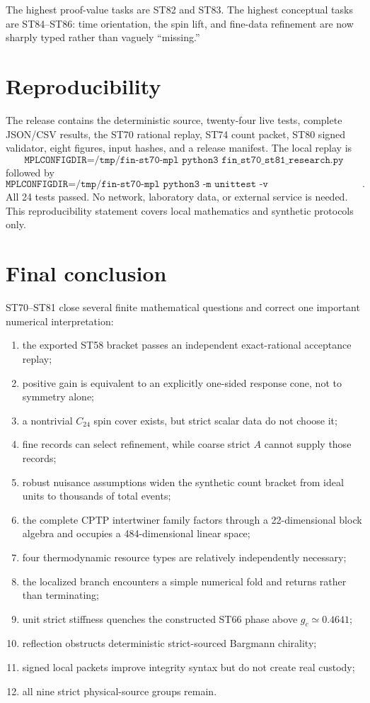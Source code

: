 \documentclass[11pt,a4paper]{article}
\begin{document}
The highest proof-value tasks are ST82 and ST83. The highest conceptual tasks are ST84--ST86: time orientation, the spin lift, and fine-data refinement are now sharply typed rather than vaguely ``missing.''

\section{Reproducibility}

The release contains the deterministic source, twenty-four live tests, complete JSON/CSV results, the ST70 rational replay, ST74 count packet, ST80 signed validator, eight figures, input hashes, and a release manifest. The local replay is
\[
\texttt{MPLCONFIGDIR=/tmp/fin-st70-mpl python3 fin\_st70\_st81\_research.py}
\]
followed by
\[
\texttt{MPLCONFIGDIR=/tmp/fin-st70-mpl python3 -m unittest -v test\_fin\_st70\_st81.py}.
\]
All 24 tests passed. No network, laboratory data, or external service is needed. This reproducibility statement covers local mathematics and synthetic protocols only.

\section{Final conclusion}

ST70--ST81 close several finite mathematical questions and correct one important numerical interpretation:
\begin{enumerate}
\item the exported ST58 bracket passes an independent exact-rational acceptance replay;
\item positive gain is equivalent to an explicitly one-sided response cone, not to symmetry alone;
\item a nontrivial $C_{24}$ spin cover exists, but strict scalar data do not choose it;
\item fine records can select refinement, while coarse strict $A$ cannot supply those records;
\item robust nuisance assumptions widen the synthetic count bracket from ideal units to thousands of total events;
\item the complete CPTP intertwiner family factors through a 22-dimensional block algebra and occupies a 484-dimensional linear space;
\item four thermodynamic resource types are relatively independently necessary;
\item the localized branch encounters a simple numerical fold and returns rather than terminating;
\item unit strict stiffness quenches the constructed ST66 phase above $g_c\simeq0.4641$;
\item reflection obstructs deterministic strict-sourced Bargmann chirality;
\item signed local packets improve integrity syntax but do not create real custody;
\item all nine strict physical-source groups remain.
\end{enumerate}
\end{document}
